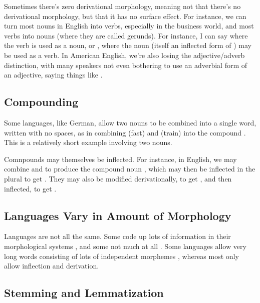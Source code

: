 Sometimes there's zero derivational morphology, meaning not that
there's no derivational morphology, but that it has no surface effect.
For instance, we can turn most nouns in English into verbs, especially
in the business world, and most verbs into nouns (where they are
called gerunds).  For instance, I can say  where the verb  is used as a noun,
or , where the noun
 (itself an inflected form of
) may be used as a verb.  In American English,
we're also losing the adjective/adverb distinction, with many speakers
not even bothering to use an adverbial form of an adjective, saying
things like .  

\subsection{Compounding}

Some languages, like German, allow two nouns to be combined
into a single word, written with no spaces, as in combining
 (fast) and  (train)
into the compound .  This is a relatively
short example involving two nouns. 

Comnpounds may themselves be inflected.  For instance, in English, we
may combine  and  to produce
the compound noun , which may then be
inflected in the plural to get .  They may
also be modified derivationally, to get ,
and then inflected, to get .


\subsection{Languages Vary in Amount of Morphology}

Languages are not all the same.  Some code up lots of information in
their morphological systems , and some not much at all
.  Some languages allow very long words consisting of
lots of independent morphemes , whereas most
only allow inflection and derivation.

\subsection{Stemming and Lemmatization}

